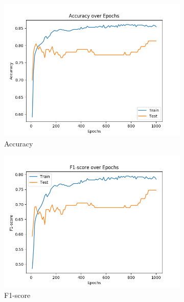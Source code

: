 \documentclass[11pt,a4paper]{article}
\begin{document}
\begin{figure}[htbp]
\begin{subfigure}{\columnwidth}
  \centering
  \includegraphics[width=\columnwidth,keepaspectratio]{acc.png}  
  \caption{Accuracy}
  \label{fig:perform-graph:acc}
\end{subfigure}
\begin{subfigure}{\columnwidth}
  \centering
  \includegraphics[width=\columnwidth,keepaspectratio]{f1.png}
  \caption{F1-score}
  \label{fig:perform-graph:f1}
\end{subfigure}
\begin{subfigure}{\columnwidth}
  \centering

\end{subfigure}
\end{figure}
\end{document}
